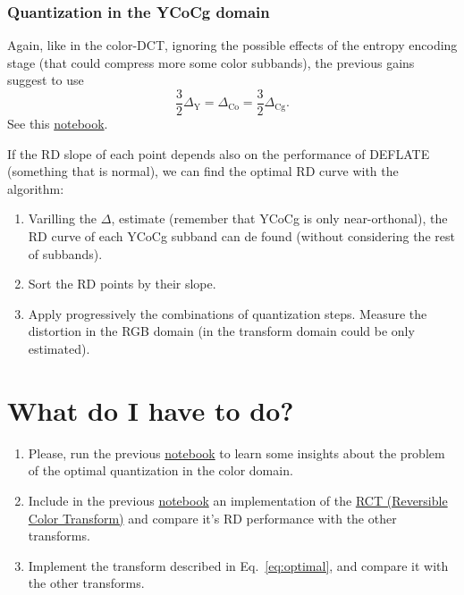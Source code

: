\subsubsection{Quantization in the YCoCg domain}
Again, like in the color-DCT, ignoring the possible effects of the
entropy encoding stage (that could compress more some color subbands),
the previous gains suggest to use
\begin{equation}
  \frac{3}{2}\Delta_{\text{Y}} = \Delta_{\text{Co}} = \frac{3}{2}\Delta_{\text{Cg}}.
\end{equation}
See this \href{https://github.com/Sistemas-Multimedia/Sistemas-Multimedia.github.io/blob/master/milestones/06-YUV_compression/YCrCb_matrix.ipynb}{notebook}.

If the RD slope of each point depends also on the performance of DEFLATE (something that is normal), we can find the optimal RD curve with the algorithm:
\begin{enumerate}
\item Varilling the $\Delta$, estimate (remember that YCoCg is only  near-orthonal), the RD curve of each YCoCg subband can de found (without considering the rest of subbands).
\item Sort the RD points by their slope.
\item Apply progressively the combinations of quantization
  steps. Measure the distortion in the RGB domain (in the transform
  domain could be only estimated).
\end{enumerate}

\section{What do I have to do?}

\begin{enumerate}
\item Please, run the previous
  \href{https://github.com/Sistemas-Multimedia/Sistemas-Multimedia.github.io/blob/master/study_guide/06-color_transform/performance.ipynb}{notebook}
  to learn some insights about the problem of the optimal
  quantization in the color domain.
\item Include in the previous
  \href{https://github.com/Sistemas-Multimedia/Sistemas-Multimedia.github.io/blob/master/study_guide/06-color_transform/performance.ipynb}{notebook}
  an implementation of the
  \href{https://en.wikipedia.org/wiki/JPEG_2000#Color_components_transformation}{RCT
    (Reversible Color Transform)} and compare it's RD performance with
  the other transforms.
\item Implement the transform described in Eq.~\ref{eq:optimal}, and
  compare it with the other transforms.
\end{enumerate}

